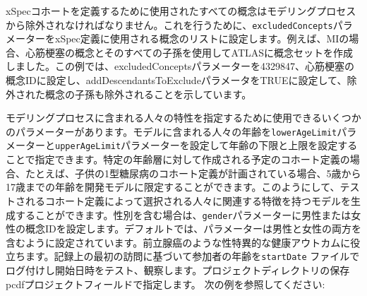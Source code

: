\documentclass[
  11pt]{book}
\theoremstyle{definition}
\theoremstyle{definition}
\theoremstyle{definition}
\theoremstyle{definition}
\theoremstyle{remark}
\begin{document}
xSpecコホートを定義するために使用されたすべての概念はモデリングプロセスから除外されなければなりません。これを行うために、\texttt{excludedConcepts}パラメーターをxSpec定義に使用される概念のリストに設定します。例えば、MIの場合、心筋梗塞の概念とそのすべての子孫を使用してATLASに概念セットを作成しました。この例では、excludedConceptsパラメーターを4329847、心筋梗塞の概念IDに設定し、addDescendantsToExcludeパラメータをTRUEに設定して、除外された概念の子孫も除外されることを示しています。

モデリングプロセスに含まれる人々の特性を指定するために使用できるいくつかのパラメーターがあります。モデルに含まれる人々の年齢を\texttt{lowerAgeLimit}パラメーターと\texttt{upperAgeLimit}パラメーターを設定して年齢の下限と上限を設定することで指定できます。特定の年齢層に対して作成される予定のコホート定義の場合、たとえば、子供の1型糖尿病のコホート定義が計画されている場合、5歳から17歳までの年齢を開発モデルに限定することができます。このようにして、テストされるコホート定義によって選択される人々に関連する特徴を持つモデルを生成することができます。性別を含む場合は、\texttt{gender}パラメーターに男性または女性の概念IDを設定します。デフォルトでは、パラメーターは男性と女性の両方を含むように設定されています。前立腺癌のような性特異的な健康アウトカムに役立ちます。記録上の最初の訪問に基づいて参加者の年齢を\texttt{startDate} ファイルでログ付けし開始日時をテスト、観察します。プロジェクトディレクトリの保存 pcdfプロジェクトフィールドで指定します。 次の例を参照してください:
\end{document}
